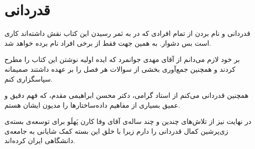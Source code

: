 \section*{قدردانی}
قدردانی و نام بردن از تمام افرادی که در به ثمر رسیدن این کتاب نقش داشته‌اند کاری است بس دشوار. به همین جهت فقط از برخی افراد نام برده خواهد شد.

بر خود لازم می‌دانم از آقای مهدی جوانمرد که ایده‌ اولیه نوشتن این کتاب را مطرح کردند و همچنین جمع‌آوری بخشی از سوالات هر فصل را بر عهده داشتند صمیمانه سپاسگزاری کنم.

همچنین قدردانی می‌کنم از استاد گرامی، دکتر محسن ابراهیمی مقدم، که فهم دقیق و عمیق بسیاری از مفاهیم داده‌ساختارها را مدیون ایشان هستم.

در نهایت نیز از تلاش‌‌های چندین و چند ساله‌ی آقای وفا کارن پَهلَو برای توسعه‌ی بسته‌ی زی‌پرشین کمال قدردانی را دارم زیرا با خلق این بسته کمک شایانی به جامعه‌ی دانشگاهی ایران کرده‌اند.

\newpage